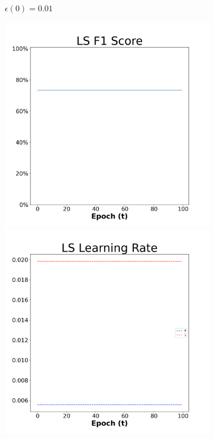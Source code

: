 \begin{figure}[H]
\begin{subfigure}{0.3\textwidth}
  \caption{$\epsilon(0)=0.01$}
\end{subfigure}\hfil %
\begin{subfigure}{0.3\textwidth}
  \includegraphics[width=\linewidth]{images/exper2/SP/LS_0.03_f1.png}
  \includegraphics[width=\linewidth]{images/exper2/SP/LS_0.03_lr.png}

\end{subfigure}
\end{figure}
